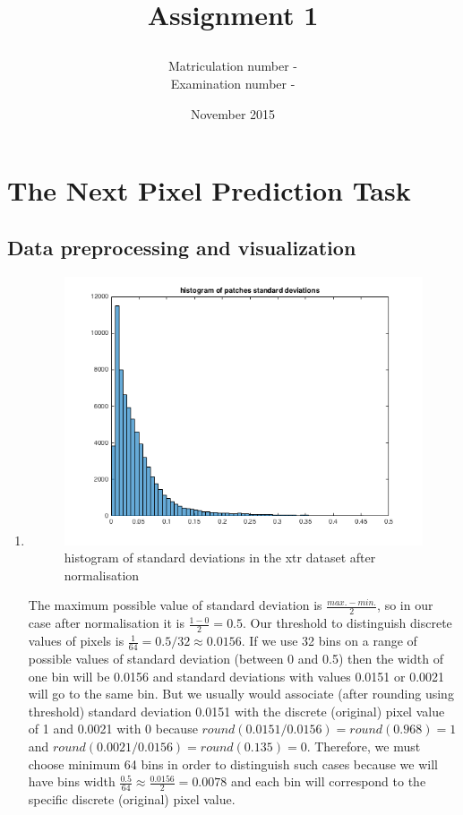 \documentclass{article}
\title{\subject\\Assignment 1}
\date{November 2015}
\author{Matriculation number - \matricno\\Examination number - \exmno}
\begin{document}
\maketitle
	\section{The Next Pixel Prediction Task}
		\subsection{Data preprocessing and visualization}
			 \begin{enumerate}[label=(\alph*)]
			 	\item
				 	\begin{figure}[htp]
				 		\centering
				 		\includegraphics[width=12cm]{images/p1-1-a_std_hist}
				 		\caption{histogram of standard deviations in the xtr dataset after normalisation}
				 		\label{fig:p1-1-a_std_hist}
				 	\end{figure}
				 	The maximum possible value of standard deviation is $\frac{max. - min.}{2}$, so in our case after normalisation it is $\frac{1 - 0}{2}= 0.5$. Our threshold to distinguish discrete values of pixels is $\frac{1}{64} = 0.5 / 32 \approx 0.0156$. If we use 32 bins on a range of possible values of standard deviation (between 0 and 0.5) then the width of one bin will be 0.0156 and standard deviations with values  0.0151 or 0.0021 will go to the same bin. But we usually would associate (after rounding using threshold) standard deviation 0.0151 with the discrete (original) pixel value of 1 and 0.0021 with 0 because $round(0.0151/0.0156)=round(0.968)=1$ and $round(0.0021/0.0156)=round(0.135)=0$. Therefore, we must choose minimum 64 bins in order to distinguish such cases because we will have bins width $\frac{0.5}{64} \approx \frac{0.0156}{2} = 0.0078$ and each bin will correspond to the specific discrete (original) pixel value.\\

\end{enumerate}
\end{document}
